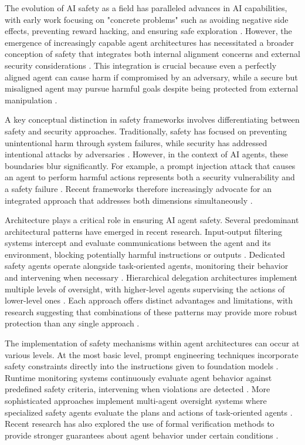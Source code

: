 \documentclass[conference]{IEEEtran}
\begin{document}
The evolution of AI safety as a field has paralleled advances in AI capabilities, with early work focusing on "concrete problems" such as avoiding negative side effects, preventing reward hacking, and ensuring safe exploration \cite{2401.10899}. However, the emergence of increasingly capable agent architectures has necessitated a broader conception of safety that integrates both internal alignment concerns and external security considerations \cite{2406.08689}. This integration is crucial because even a perfectly aligned agent can cause harm if compromised by an adversary, while a secure but misaligned agent may pursue harmful goals despite being protected from external manipulation \cite{2405.19524}.

A key conceptual distinction in safety frameworks involves differentiating between safety and security approaches. Traditionally, safety has focused on preventing unintentional harm through system failures, while security has addressed intentional attacks by adversaries \cite{2405.19524}. However, in the context of AI agents, these boundaries blur significantly. For example, a prompt injection attack that causes an agent to perform harmful actions represents both a security vulnerability and a safety failure \cite{2406.08689}. Recent frameworks therefore increasingly advocate for an integrated approach that addresses both dimensions simultaneously \cite{2405.19524} \cite{2504.16110}.

Architecture plays a critical role in ensuring AI agent safety. Several predominant architectural patterns have emerged in recent research. Input-output filtering systems intercept and evaluate communications between the agent and its environment, blocking potentially harmful instructions or outputs \cite{2409.03793}. Dedicated safety agents operate alongside task-oriented agents, monitoring their behavior and intervening when necessary \cite{2409.03793}. Hierarchical delegation architectures implement multiple levels of oversight, with higher-level agents supervising the actions of lower-level ones \cite{2409.03793}. Each approach offers distinct advantages and limitations, with research suggesting that combinations of these patterns may provide more robust protection than any single approach \cite{2408.12935}.

The implementation of safety mechanisms within agent architectures can occur at various levels. At the most basic level, prompt engineering techniques incorporate safety constraints directly into the instructions given to foundation models \cite{2406.02630}. Runtime monitoring systems continuously evaluate agent behavior against predefined safety criteria, intervening when violations are detected \cite{2208.14426}. More sophisticated approaches implement multi-agent oversight systems where specialized safety agents evaluate the plans and actions of task-oriented agents \cite{2409.03793}. Recent research has also explored the use of formal verification methods to provide stronger guarantees about agent behavior under certain conditions \cite{2405.06624}.
\end{document}
